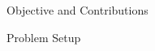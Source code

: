 \documentclass[final]{beamer}
\newlength{\onecolwid}
\begin{document}
\begin{frame}[t]
\begin{columns}[t]
\begin{column}{\onecolwid}
\begin{alertblock}{Objective and Contributions}
%


\end{alertblock}

\vskip -1cm
\begin{block}{Problem Setup}
\vskip -1cm


\end{block}
\end{column}
\end{columns}
\end{frame}
\end{document}
